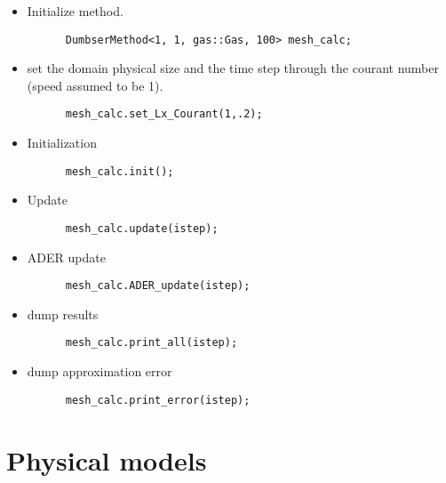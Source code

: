 \documentclass[a5paper]{article}
\begin{document}
\begin{itemize}
  \item Initialize method. 
    \begin{lstlisting}
      DumbserMethod<1, 1, gas::Gas, 100> mesh_calc;
    \end{lstlisting}
  \item set the domain physical size and the time step through the courant number (speed assumed to be 1).
    \begin{lstlisting}
      mesh_calc.set_Lx_Courant(1,.2);
    \end{lstlisting}
  \item Initialization
    \begin{lstlisting}
      mesh_calc.init();
    \end{lstlisting}
  \item Update
    \begin{lstlisting}
      mesh_calc.update(istep);
    \end{lstlisting}
  \item ADER update 
    \begin{lstlisting}
      mesh_calc.ADER_update(istep);
    \end{lstlisting}
  \item dump results
    \begin{lstlisting}
      mesh_calc.print_all(istep);
    \end{lstlisting}
  \item  dump approximation error
    \begin{lstlisting}
      mesh_calc.print_error(istep);
    \end{lstlisting}
\end{itemize}

%
%

\clearpage
\section{Physical models}\label{sec:models}
\end{document}
